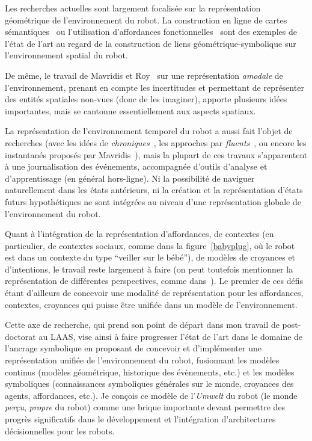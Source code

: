 \documentclass[a4paper]{article}
\begin{document}
Les recherches actuelles sont largement focalisée sur la représentation
géométrique de l'environnement du robot. La construction en ligne de
cartes sémantiques~\cite{Nuechter2008, Galindo2008,
Blodow2011} ou l'utilisation d'affordances fonctionnelles~\cite{Varadarajan2011}
sont des exemples de l'état de l'art au regard de la construction de liens
géométrique-symbolique sur l'environnement spatial du robot.

De même, le travail de Mavridis et Roy~\cite{Mavridis2006} sur une
représentation \emph{amodale} de l'environnement, prenant en compte les
incertitudes et permettant de représenter des entités spatiales non-vues (donc
de les imaginer), apporte plusieurs idées importantes, mais se cantonne
essentiellement aux aspects spatiaux.

La représentation de l'environnement temporel du robot a aussi fait l'objet de
recherches (avec les idées de \emph{chroniques}~\cite{Ghallab1996}, les
approches par \emph{fluents}~\cite{mosenlechner2010becoming}, ou encore les
instantanés proposés par Mavridis~\cite{Mavridis2006}), mais la plupart de ces
travaux s'apparentent à une journalisation des événements, accompagnée d'outils
d'analyse et d'apprentissage (en général hors-ligne). Ni la possibilité de
naviguer naturellement dans les états antérieurs, ni la création et la
représentation d'états futurs hypothétiques ne sont intégrées au niveau d'une
représentation globale de l'environnement du robot.

Quant à l'intégration de la représentation d'affordances, de contextes (en
particulier, de contextes sociaux, comme dans la figure~\ref{babyplug}, où le
robot est dans un contexte du type ``veiller sur le bébé''), de modèles de
croyances et d'intentions, le travail reste largement à faire (on peut toutefois
mentionner la représentation de différentes perspectives, comme
dans~\cite{ros2010which}). Le premier de ces défis étant d'ailleurs de concevoir
une modalité de représentation pour les affordances, contextes, croyances qui
puisse être unifiée dans un modèle de l'environnement.

Cette axe de recherche, qui prend son point de départ dans mon travail de
post-doctorat au LAAS, vise ainsi à faire progresser l'état de l'art dans le
domaine de l'ancrage symbolique en proposant de concevoir et d'implémenter une
représentation unifiée de l'environnement du robot, fusionnant les modèles
continus (modèles géométrique, historique des évènements, etc.) et les modèles
symboliques (connaissances symboliques générales sur le monde, croyances des
agents, affordances, etc.). Je conçois ce modèle de l'\emph{Umwelt} du robot (le
monde \emph{perçu}, \emph{propre} du robot) comme une brique importante devant
permettre des progrès significatifs dans le développement et l'intégration
d'architectures décisionnelles pour les robots.
\end{document}
